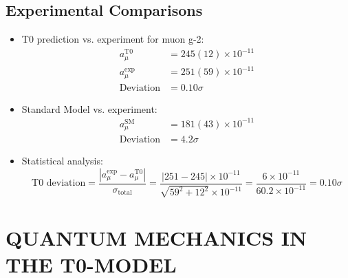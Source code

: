 \documentclass[12pt,a4paper]{article}
\begin{document}
	\subsection{Experimental Comparisons}
	\begin{itemize}
		\item T0 prediction vs. experiment for muon g-2:
		\begin{align*}
			a_\mu^{\text{T0}} &= 245(12) \times 10^{-11}\\
			a_\mu^{\text{exp}} &= 251(59) \times 10^{-11}\\
			\text{Deviation} &= 0.10\sigma
		\end{align*}
		
		\item Standard Model vs. experiment:
		\begin{align*}
			a_\mu^{\text{SM}} &= 181(43) \times 10^{-11}\\
			\text{Deviation} &= 4.2\sigma
		\end{align*}
		
		\item Statistical analysis:
		$$\text{T0 deviation} = \frac{|a_\mu^{\text{exp}} - a_\mu^{\text{T0}}|}{\sigma_{\text{total}}} = \frac{|251 - 245| \times 10^{-11}}{\sqrt{59^2 + 12^2} \times 10^{-11}} = \frac{6 \times 10^{-11}}{60.2 \times 10^{-11}} = 0.10\sigma$$
	\end{itemize}
	
	\section{QUANTUM MECHANICS IN THE T0-MODEL}
	
\end{document}
